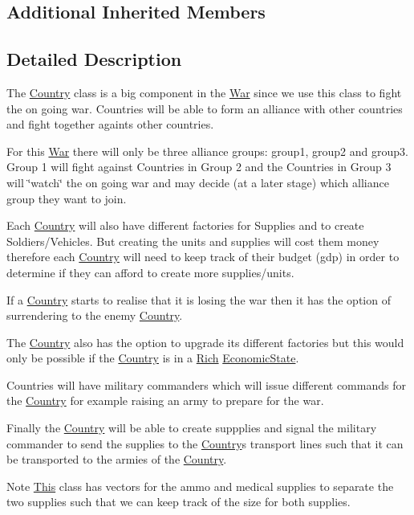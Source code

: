 \subsection*{Additional Inherited Members}


\subsection{Detailed Description}
The \mbox{\hyperlink{class_country}{Country}} class is a big component in the \mbox{\hyperlink{class_war}{War}} since we use this class to fight the on going war. Countries will be able to form an alliance with other countries and fight together againts other countries.
\begin{DoxyItemize}
\item For this \mbox{\hyperlink{class_war}{War}} there will only be three alliance groups\+: group1, group2 and group3. Group 1 will fight against Countries in Group 2 and the Countries in Group 3 will \char`\"{}watch\char`\"{} the on going war and may decide (at a later stage) which alliance group they want to join.
\item Each \mbox{\hyperlink{class_country}{Country}} will also have different factories for Supplies and to create Soldiers/\+Vehicles. But creating the units and supplies will cost them money therefore each \mbox{\hyperlink{class_country}{Country}} will need to keep track of their budget (gdp) in order to determine if they can afford to create more supplies/units.
\item If a \mbox{\hyperlink{class_country}{Country}} starts to realise that it is losing the war then it has the option of surrendering to the enemy \mbox{\hyperlink{class_country}{Country}}.
\item The \mbox{\hyperlink{class_country}{Country}} also has the option to upgrade its different factories but this would only be possible if the \mbox{\hyperlink{class_country}{Country}} is in a \mbox{\hyperlink{class_rich}{Rich}} \mbox{\hyperlink{class_economic_state}{Economic\+State}}.
\item Countries will have military commanders which will issue different commands for the \mbox{\hyperlink{class_country}{Country}} for example raising an army to prepare for the war.
\item Finally the \mbox{\hyperlink{class_country}{Country}} will be able to create suppplies and signal the military commander to send the supplies to the \mbox{\hyperlink{class_country}{Country}}\textquotesingle{}s transport lines such that it can be transported to the armies of the \mbox{\hyperlink{class_country}{Country}}. \begin{DoxyNote}{Note}
\mbox{\hyperlink{class_this}{This}} class has vectors for the ammo and medical supplies to separate the two supplies such that we can keep track of the size for both supplies. 
\end{DoxyNote}

\end{DoxyItemize}

